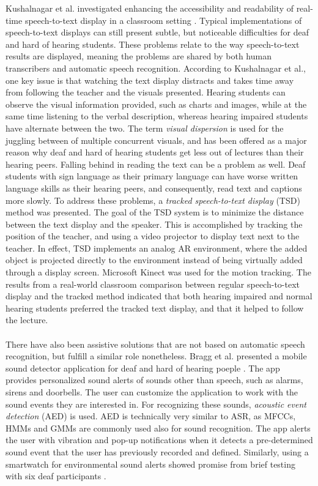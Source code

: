 \documentclass[english, 12pt, a4paper, pdftex, elec, utf8]{aaltothesis}
\begin{document}
Kushalnagar et al. investigated enhancing the accessibility and readability of real-time speech-to-text display in a classroom setting \cite{kushalnagar2015tracked}. Typical implementations of speech-to-text displays can still present subtle, but noticeable difficulties for deaf and hard of hearing students. These problems relate to the way speech-to-text results are displayed, meaning the problems are shared by both human transcribers and automatic speech recognition. According to Kushalnagar et al., one key issue is that watching the text display distracts and takes time away from following the teacher and the visuals presented. Hearing students can observe the visual information provided, such as charts and images, while at the same time listening to the verbal description, whereas hearing impaired students have alternate between the two. The term \textit{visual dispersion} is used for the juggling between of multiple concurrent visuals, and has been offered as a major reason why deaf and hard of hearing students get less out of lectures than their hearing peers. Falling behind in reading the text can be a problem as well. Deaf students with sign language as their primary language can have worse written language skills as their hearing peers, and consequently, read text and captions more slowly. To address these problems, a \textit{tracked speech-to-text display} (TSD) method was presented. The goal of the TSD system is to minimize the distance between the text display and the speaker. This is accomplished by tracking the position of the teacher, and using a video projector to display text next to the teacher. In effect, TSD implements an analog AR environment, where the added object is projected directly to the environment instead of being virtually added through a display screen. Microsoft Kinect was used for the motion tracking. The results from a real-world classroom comparison between regular speech-to-text display and the tracked method indicated that both hearing impaired and normal hearing students preferred the tracked text display, and that it helped to follow the lecture. \\\\
There have also been assistive solutions that are not based on automatic speech recognition, but fulfill a similar role nonetheless. Bragg et al. presented a mobile sound detector application for deaf and hard of hearing poeple \cite{bragg2016personalizable}. The app provides personalized sound alerts of sounds other than speech, such as alarms, sirens and doorbells. The user can customize the application to work with the sound events they are interested in. For recognizing these sounds, \textit{acoustic event detection} (AED) is used. AED is technically very similar to ASR, as MFCCs, HMMs and GMMs are commonly used also for sound recognition. The app alerts the user with vibration and pop-up notifications when it detects a pre-determined sound event that the user has previously recorded and defined. Similarly, using a smartwatch for environmental sound alerts showed promise from brief testing with six deaf participants \cite{mielke2015pilot}. \\\\
\end{document}
